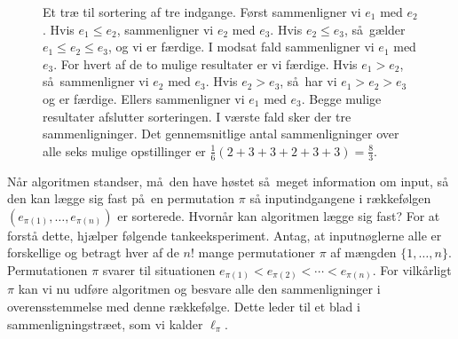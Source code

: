 \begin{figure}[b] 
  \newcommand{\compr}{\,{\scriptstyle ?}\,}
\caption{
  Et træ til sortering af tre indgange.
  Først sammenligner vi $e_1$ med $e_2$. 
   Hvis $e_1 \le e_2$, sammenligner vi $e_2$ med $e_3$. 
Hvis $e_2 \le e_3$, så gælder $e_1 \le e_2 \le e_3$, og vi er færdige.
I modsat fald sammenligner vi $e_1$ med $e_3$. 
For hvert af de to mulige resultater er vi færdige.
Hvis $e_1 > e_2$, så sammenligner vi $e_2$ med $e_3$. 
  Hvis $e_2 > e_3$, så har vi $e_1 > e_2 > e_3$ og er færdige. 
  Ellers sammenligner vi $e_1$ med $e_3$. 
  Begge mulige resultater afslutter sorteringen.
  I værste fald sker der tre sammenligninger.
  Det gennemsnitlige antal sammenligninger over alle seks mulige opstillinger er $\frac16(2 + 3 + 3 + 2 + 3 + 3) = \frac83$.}
\end{figure}

Når algoritmen standser, må den have høstet så meget information om input, så den kan lægge sig fast på en permutation 
$\pi$ så input\-indgangene i rækkefølgen $(e_{\pi(1)}, \ldots ,e_{\pi(n)})$ er sorterede.
Hvornår kan algoritmen lægge sig fast?
For at forstå dette, hjælper følgende tankeeksperiment.
Antag, at input\-nøglerne alle er forskellige og betragt hver af de $n!$ mange  permutationer $\pi$ af mængden $\{1,\ldots,n\}$. 
Permutationen $\pi$ svarer til situationen $e_{\pi(1)} < e_{\pi(2)} < \cdots < e_{\pi(n)}$.
For vilkårligt $\pi$ kan vi nu udføre algoritmen og besvare alle den sammenligninger i overensstemmelse med denne rækkefølge.
Dette leder til et blad i sammenligningstræet, som vi kalder $\ell_\pi$.

